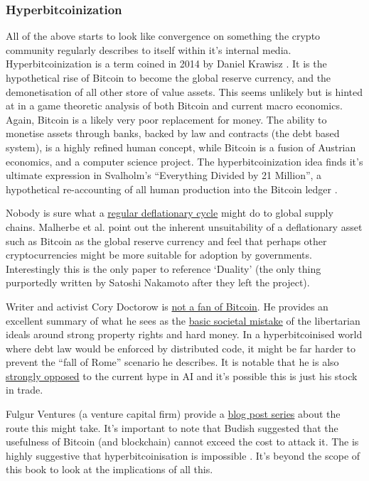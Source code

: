 \begin{itemize}
\subsubsection{Hyperbitcoinization}
All of the above starts to look like convergence on something the crypto community regularly describes to itself within it's internal media. Hyperbitcoinization is a term coined in 2014 by Daniel Krawisz \cite{krawisz2014hyperbitcoinization}. It is the hypothetical rise of Bitcoin to become the global reserve currency, and the demonetisation of all other store of value assets. This seems unlikely but is hinted at in a game theoretic analysis of both Bitcoin and current macro economics. Again, Bitcoin is a likely very poor replacement for money. The ability to monetise assets through banks, backed by law and contracts (the debt based system), is a highly refined human concept, while Bitcoin is a fusion of Austrian economics, and a computer science project. The hyperbitcoinization idea finds it's ultimate expression in Svalholm's ``Everything Divided by 21 Million'', a hypothetical re-accounting of all human production into the Bitcoin ledger \cite{booth2022bitcoin}.\par
Nobody is sure what a \href{https://fredblog.stlouisfed.org/2022/07/inflation-and-deflation-with-a-fixed-money-supply/}{regular deflationary cycle} might do to global supply chains. Malherbe et al. point out the inherent unsuitability of a deflationary asset such as Bitcoin as the global reserve currency \cite{malherbe2019cryptocurrencies} and feel that perhaps other cryptocurrencies might be more suitable for adoption by governments.  Interestingly this is the only paper to reference `Duality' (the only thing purportedly written by Satoshi Nakamoto after they left the project). \par
Writer and activist Cory Doctorow is \href{https://onezero.medium.com/the-byzantine-premium-8411521db843}{not a fan of Bitcoin}. He provides an excellent summary of what he sees as the \href{https://doctorow.medium.com/finance-caused-the-fall-of-rome-fd091fa02973}{basic societal mistake} of the libertarian ideals around strong property rights and hard money. In a hyperbitcoinised world where debt law would be enforced by distributed code, it might be far harder to prevent the ``fall of Rome'' scenario he describes. It is notable that he is also \href{https://pluralistic.net/2023/03/09/autocomplete-worshippers/#the-real-ai-was-the-corporations-that-we-fought-along-the-way}{strongly opposed} to the current hype in AI and it's possible this is just his stock in trade.\par  
Fulgur Ventures (a venture capital firm) provide a \href{https://medium.com/@fulgur.ventures/the-roads-to-hyperbitcoinization-part-1-27dc84d0e5e5}{blog post series} about the route this might take. It's important to note that Budish suggested that the usefulness of Bitcoin (and blockchain) cannot exceed the cost to attack it. The is highly suggestive that hyperbitcoinisation is impossible \cite{budish2018economic}. It's beyond the scope of this book to look at the implications of all this. 


\end{itemize}
